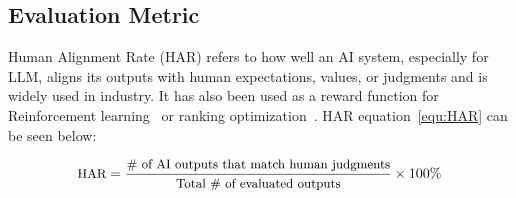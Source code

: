 
\subsection{Evaluation Metric}

Human Alignment Rate (HAR) refers to how well an AI system, especially for LLM, aligns its outputs with human expectations, values, or judgments and is widely used in industry. It has also been used as a reward function for Reinforcement learning~\cite{kaufmann2023survey,kabir2025beyond} or ranking optimization~\cite{song2024preference}.
HAR equation~\ref{equ:HAR} can be seen below: 

\begin{equation}\label{equ:HAR}\small
\text{HAR} = \frac{\text{\# of AI outputs that match human judgments}}{\text{Total \# of evaluated outputs}} \times 100\%
\end{equation}









